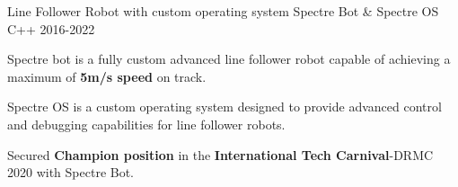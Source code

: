 \begin{cventries}
  \cventry
    {Line Follower Robot with custom operating system} %
    {Spectre Bot \& Spectre OS} %
    {C++} %
    {2016-2022} %
    {
      \begin{cvitems} %
        \item {Spectre bot is a fully custom advanced line 
        follower robot capable of achieving a maximum of \textbf{5m/s speed} on track.}
        \item {Spectre OS is a custom operating system designed to provide advanced control and 
        debugging capabilities for line follower robots.}
        \item {Secured \textbf{Champion position} in the \textbf{International Tech Carnival}-DRMC 2020 with Spectre Bot.}
      \end{cvitems}
    }

\end{cventries}
